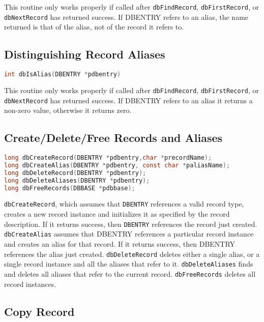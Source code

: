 This routine only works properly if called after \verb|dbFindRecord|, \verb|dbFirstRecord|, or \verb|dbNextRecord| has returned success.
If DBENTRY refers to an alias, the name returned is that of the alias, not of the record it refers to.

\subsection{Distinguishing Record Aliases}

\begin{lstlisting}[language=C]
int dbIsAlias(DBENTRY *pdbentry)
\end{lstlisting}

This routine only works properly if called after \verb|dbFindRecord|, \verb|dbFirstRecord|, or \verb|dbNextRecord| has returned success.
If DBENTRY refers to an alias it returns a non-zero value, otherwise it returns zero.

\subsection{Create/Delete/Free Records and Aliases}

\begin{lstlisting}[language=C]
long dbCreateRecord(DBENTRY *pdbentry,char *precordName);
long dbCreateAlias(DBENTRY *pdbentry, const char *paliasName);
long dbDeleteRecord(DBENTRY *pdbentry);
long dbDeleteAliases(DBENTRY *pdbentry);
long dbFreeRecords(DBBASE *pdbbase);
\end{lstlisting}

\verb|dbCreateRecord|, which assumes that \verb|DBENTRY| references a valid record type, creates a new record instance and 
initializes it as specified by the record description.
If it returns success, then \verb|DBENTRY| references the record just created.
\verb|dbCreateAlias| assumes that DBENTRY references a particular record instance and creates an alias for that record.
If it returns success, then DBENTRY references the alias just created.
\verb|dbDeleteRecord| deletes either a single alias, or a single record instance and all the aliases that refer to it. \verb|dbDeleteAliases| finds and deletes all aliases that refer to the current record.
\verb|dbFreeRecords| deletes all record instances.

\subsection{Copy Record}

